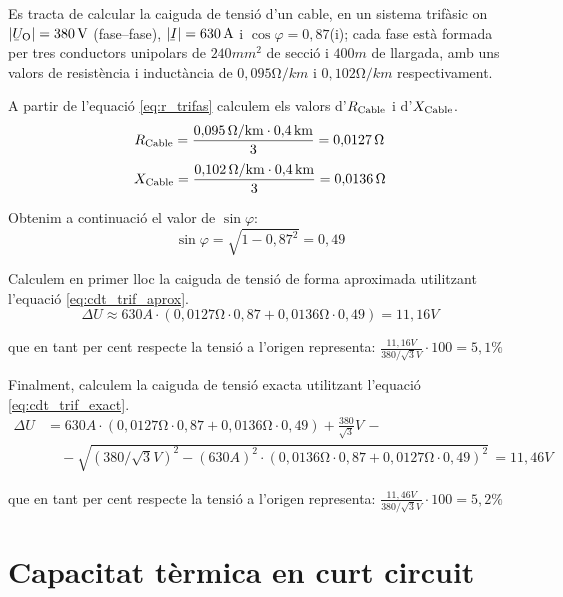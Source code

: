 \begin{exemple}
   Es tracta de calcular la caiguda de tensi\'{o} d'un cable, en un sistema trif\`{a}sic on $|\cmplx{U}\ped{O}| = 380\unit{V}$ (fase--fase), $|\cmplx{I}|=630\unit{A}$ i $\cos \varphi = 0{,}87$(i); cada fase est\`{a} formada per tres conductors unipolars de $240\unit{mm^2}$ de secci\'{o} i $400\unit{m}$ de llargada, amb uns valors de resist\`{e}ncia i induct\`{a}ncia de $0{,}095\unit{\ohm/km}$ i $0{,}102\unit{\ohm/km}$ respectivament.

A partir de l'equaci\'{o} \eqref{eq:r_trifas} calculem els valors d'$R_\mathrm{Cable}$ i d'$X_\mathrm{Cable}$.
\[
   R_\mathrm{Cable} = \frac{0{,}095\mathrm{\,\mathrm{\Omega}/km}\cdot 0{,}4\mathrm{\,km}}{3} = 0{,}0127\mathrm{\,\mathrm{\Omega}}
\]
\[
   X_\mathrm{Cable} = \frac{0{,}102\mathrm{\,\mathrm{\Omega}/km}\cdot 0{,}4\mathrm{\,km}}{3} = 0{,}0136\mathrm{\,\mathrm{\Omega}}
\]

Obtenim a continuaci\'{o} el valor de $\sin \varphi$:
\[
   \sin \varphi = \sqrt{1-0{,}87^2} = 0,49
\]

Calculem en primer lloc la caiguda de tensi\'{o} de forma aproximada utilitzant l'equaci\'{o} \eqref{eq:cdt_trif_aprox}.
\[
   \Delta U \approx 630\unit{A} \cdot ( 0{,}0127\unit{\ohm} \cdot 0{,}87 + 0{,}0136\unit{\ohm} \cdot 0{,}49 ) = 11{,}16\unit{V}
\]

que en tant per cent respecte la tensi\'{o} a l'origen representa:
$\frac{11{,}16\unit{V}}{380/\sqrt{3}\unit{V}} \cdot 100 = 5{,}1\unit{\%} $

Finalment, calculem la caiguda de tensi\'{o} exacta utilitzant l'equaci\'{o} \eqref{eq:cdt_trif_exact}.
\[ \begin{split}
   \Delta U &=  630\unit{A} \cdot ( 0{,}0127\unit{\ohm} \cdot 0{,}87 + 0{,}0136\unit{\ohm} \cdot 0{,}49 ) + \frac{380}{\sqrt{3}}\unit{V} \,- \\
    & \quad - \sqrt{(380/\sqrt{3}\unit{V})^2 - (630\unit{A})^2 \cdot ( 0{,}0136\unit{\ohm} \cdot 0{,}87 + 0{,}0127\unit{\ohm} \cdot 0{,}49 )^2 } \,= 11{,}46\unit{V}
\end{split} \]

que en tant per cent respecte la tensi\'{o} a l'origen representa:
$\frac{11{,}46\unit{V}}{380/\sqrt{3}\unit{V}} \cdot 100 = 5{,}2\unit{\%} $
\end{exemple}

\section{Capacitat t\`{e}rmica en curt circuit}

